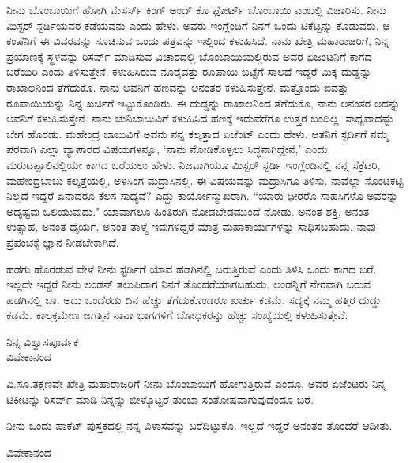 ನೀನು ಬೊಂಬಾಯಿಗೆ ಹೋಗಿ ಮೆಸರ್ಸ್ ಕಿಂಗ್ ಅಂಡ್ ಕೊ ಫೋರ್ಟ್ ಬೊಂಬಾಯಿ ಎಂಬಲ್ಲಿ ವಿಚಾರಿಸು. ನೀನು ಮಿಸ್ಟರ್ ಸ್ಟರ್ಡಿಯವರ ಕಡೆಯವನು ಎಂದು ಹೇಳು. ಅವರು ಇಂಗ್ಲೆಂಡಿಗೆ ನಿನಗೆ ಒಂದು ಟಿಕೆಟ್ಟನ್ನು ಕೊಡುವರು. ಆ ಕಂಪೆನಿಗೆ ಈ ವಿವರವನ್ನು ಸೂಚಿಸುವ ಒಂದು ಪತ್ರವನ್ನು ಇಲ್ಲಿಂದ ಕಳುಹಿಸಿದೆ. ನಾನು ಖೇತ್ರಿ ಮಹಾರಾಜರಿಗೆ, ನಿನ್ನ ಪ್ರಯಾಣಕ್ಕೆ ಸ್ಥಳವನ್ನು ರಿಸರ್ವ್ ಮಾಡಿಸುವ ವಿಚಾರದಲ್ಲಿ ಬೊಂಬಾಯಿಯಲ್ಲಿರುವ ಅವರ ಏಜಂಟನಿಗೆ ಕಾಗದ ಬರೆಯಿರಿ ಎಂದು ತಿಳಿಸುತ್ತೇನೆ. ಕಳುಹಿಸಿರುವ ನೂರೈವತ್ತು ರೂಪಾಯಿ ಬಟ್ಟೆಗೆ ಸಾಲದೆ ಇದ್ದರೆ ಮಿಕ್ಕ ದುಡ್ಡನ್ನು ರಾಖಾಲನಿಂದ ತೆಗೆದುಕೊ. ನಾನು ಅವನಿಗೆ ಹಣವನ್ನು ಅನಂತರ ಕಳುಹಿಸುತ್ತೇನೆ. ಮತ್ತೊಂದು ಐವತ್ತು ರೂಪಾಯಿಯನ್ನು ನಿನ್ನ ಖರ್ಚಿಗೆ ಇಟ್ಟುಕೊಂಡಿರು. ಈ ದುಡ್ಡನ್ನು ರಾಖಾಲನಿಂದ ತೆಗೆದುಕೊ, ನಾನು ಅನಂತರ ಅದನ್ನು ಅವನಿಗೆ ಕಳುಹಿಸುತ್ತೇನೆ. ನಾನು ಚುನಿಬಾಬುವಿಗೆ ಕಳುಹಿಸಿದ ಹಣಕ್ಕೆ ಇದುವರೆಗೂ ಉತ್ತರ ಬಂದಿಲ್ಲ. ಸಾಧ್ಯವಾದಷ್ಟು ಬೇಗ ಹೊರಡು. ಮಹೇಂದ್ರ ಬಾಬುವಿಗೆ ಅವನು ನನ್ನ ಕಲ್ಕತ್ತಾದ ಏಜೆಂಟ್ ಎಂದು ಹೇಳು. ಆತನಿಗೆ ಸ್ಟರ್ಡಿಗೆ ನಮ್ಮ ಪರವಾಗಿ ಎಲ್ಲಾ ವ್ಯಾಪಾರದ ವಿಷಯಗಳನ್ನೂ, `ನಾನು ನೋಡಿಕೊಳ್ಳಲು ಸಿದ್ಧನಾಗಿದ್ದೇನೆ,' ಎಂದು ಮರುಟಪ್ಪಾಲಿನಲ್ಲಿಯೇ ಕಾಗದ ಬರೆಯಲು ಹೇಳು. ನಿಜವಾಗಿಯೂ ಮಿಸ್ಟರ್ ಸ್ಟರ್ಡಿ ಇಂಗ್ಲೆಂಡಿನಲ್ಲಿ ನನ್ನ ಸೆಕ್ರೆಟರಿ, ಮಹೇಂದ್ರಬಾಬು ಕಲ್ಕತ್ತೆಯಲ್ಲಿ, ಅಳಸಿಂಗ ಮದ್ರಾಸಿನಲ್ಲಿ. ಈ ವಿಷಯವನ್ನು ಮದ್ರಾಸಿಗೂ ತಿಳಿಸು. ನಾವೆಲ್ಲಾ ಸೊಂಟಕಟ್ಟಿ ನಿಲ್ಲದೆ ಇದ್ದರೆ ಏನಾದರೂ ಕೆಲಸ ಸಾಧ್ಯವೆ? ಎದ್ದು ಕಾರ್ಯೋನ್ಮುಖರಾಗಿ. ``ಯಾರು ಧೀರರೊ ಸಾಹಸಿಗಳೊ ಅವರನ್ನು ಅದೃಷ್ಟವು ಒಲಿಯುವುದು." ಯಾವಾಗಲೂ ಹಿಂತಿರುಗಿ ನೋಡಬೇಡ\enginline{-}ಮುಂದೆ ನೋಡು. ಅನಂತ ಶಕ್ತಿ, ಅನಂತ ಉತ್ಸಾಹ, ಅನಂತ ಧೈರ್ಯ, ಅನಂತ ತಾಳ್ಮೆ ಇವುಗಳಿದ್ದರೆ ಮಾತ್ರ ಮಹಾಕಾರ್ಯಗಳನ್ನು ಸಾಧಿಸಬಹುದು. ನಾವು ಪ್ರಪಂಚಕ್ಕೆ ಜ್ಞಾನ ನೀಡಬೇಕಾಗಿದೆ.

ಹಡಗು ಹೊರಡುವ ವೇಳೆ ನೀನು ಸ್ಟರ್ಡಿಗೆ ಯಾವ ಹಡಗಿನಲ್ಲಿ ಬರುತ್ತಿರುವೆ ಎಂದು ತಿಳಿಸಿ ಒಂದು ಕಾಗದ ಬರೆ. ಇಲ್ಲದೇ ಇದ್ದರೆ ನೀನು ಲಂಡನ್ ತಲುಪಿದಾಗ ನಿನಗೆ ತೊಂದರೆಯಾಗಬಹುದು. ಲಂಡನ್ನಿಗೆ ನೇರವಾಗಿ ಬರುವ ಹಡಗಿನಲ್ಲಿ ಬಾ. ಅದು ಒಂದೆರಡು ದಿನ ಹೆಚ್ಚು ತೆಗೆದುಕೊಂಡರೂ ಖರ್ಚು ಕಡಮೆ. ಸದ್ಯಕ್ಕೆ ನಮ್ಮ ಹತ್ತಿರ ದುಡ್ಡು ಕಡಮೆ. ಕಾಲಕ್ರಮೇಣ ಜಗತ್ತಿನ ನಾನಾ ಭಾಗಗಳಿಗೆ ಬೋಧಕರನ್ನು ಹೆಚ್ಚು ಸಂಖ್ಯೆಯಲ್ಲಿ ಕಳುಹಿಸುತ್ತೇವೆ.

\vspace{-0.3cm}

\begin{flushright}
ನಿನ್ನ ವಿಶ್ವಾಸಪೂರ್ವಕ\\ವಿವೇಕಾನಂದ
\end{flushright}

ವಿ.ಸೂ.\enginline{-}ತಕ್ಷಣವೇ ಖೇತ್ರಿ ಮಹಾರಾಜರಿಗೆ ನೀನು ಬೊಂಬಾಯಿಗೆ ಹೋಗುತ್ತಿರುವೆ ಎಂದೂ, ಅವರ ಏಜೆಂಟರು ನಿನ್ನ ಟಿಕೀಟನ್ನು ರಿಸರ್ವ್ ಮಾಡಿ ನಿನ್ನನ್ನು ಬೀಳ್ಕೊಟ್ಟರೆ ತುಂಬಾ ಸಂತೋಷವಾಗುವುದೆಂದೂ ಬರೆ.

ನೀನು ಒಂದು ಪಾಕೆಟ್ ಪುಸ್ತಕದಲ್ಲಿ ನನ್ನ ವಿಳಾಸವನ್ನು ಬರೆದಿಟ್ಟುಕೊ. ಇಲ್ಲದೆ ಇದ್ದರೆ ಅನಂತರ ತೊಂದರೆ ಆದೀತು.

\vspace{-0.3cm}

{\flushright
ವಿವೇಕಾನಂದ\par}

